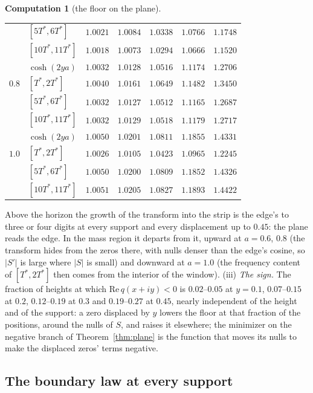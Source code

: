 \documentclass[11pt]{article}
\theoremstyle{definition}
\newtheorem{computation}[theorem]{Computation}
\theoremstyle{remark}
\newcommand{\Tst}{T^{*}}
\begin{document}
\begin{computation}[the floor on the plane]
\begin{center}
\begin{tabular}{@{}llccccc@{}}
 & $[5\Tst,6\Tst]$ & $1.0021$ & $1.0084$ & $1.0338$ & $1.0766$ & $1.1748$\\
 & $[10\Tst,11\Tst]$ & $1.0018$ & $1.0073$ & $1.0294$ & $1.0666$ & $1.1520$\\
\midrule
 & $\cosh(2ya)$ & $1.0032$ & $1.0128$ & $1.0516$ & $1.1174$ & $1.2706$\\
$0.8$ & $[\Tst,2\Tst]$ & $1.0040$ & $1.0161$ & $1.0649$ & $1.1482$ & $1.3450$\\
 & $[5\Tst,6\Tst]$ & $1.0032$ & $1.0127$ & $1.0512$ & $1.1165$ & $1.2687$\\
 & $[10\Tst,11\Tst]$ & $1.0032$ & $1.0129$ & $1.0518$ & $1.1179$ & $1.2717$\\
\midrule
 & $\cosh(2ya)$ & $1.0050$ & $1.0201$ & $1.0811$ & $1.1855$ & $1.4331$\\
$1.0$ & $[\Tst,2\Tst]$ & $1.0026$ & $1.0105$ & $1.0423$ & $1.0965$ & $1.2245$\\
 & $[5\Tst,6\Tst]$ & $1.0050$ & $1.0200$ & $1.0809$ & $1.1852$ & $1.4326$\\
 & $[10\Tst,11\Tst]$ & $1.0051$ & $1.0205$ & $1.0827$ & $1.1893$ & $1.4422$\\
\bottomrule
\end{tabular}
\end{center}
Above the horizon the growth of the transform into the strip is the edge's to three or four digits at every support and every displacement up to $0.45$: the plane reads the edge. In the mass region it departs from it, upward at $a=0.6$, $0.8$ (the transform hides from the zeros there, with nulls denser than the edge's cosine, so $|S'|$ is large where $|S|$ is small) and downward at $a=1.0$ (the frequency content of $[\Tst,2\Tst]$ then comes from the interior of the window). (iii) \emph{The sign.} The fraction of heights at which $\mathrm{Re}\,q(x+iy)<0$ is $0.02$--$0.05$ at $y=0.1$, $0.07$--$0.15$ at $0.2$, $0.12$--$0.19$ at $0.3$ and $0.19$--$0.27$ at $0.45$, nearly independent of the height and of the support: a zero displaced by $y$ lowers the floor at that fraction of the positions, around the nulls of $S$, and raises it elsewhere; the minimizer on the negative branch of Theorem~\ref{thm:plane} is the function that moves its nulls to make the displaced zeros' terms negative.
\end{computation}


\subsection{The boundary law at every support}\label{sec:everysupport}
\end{document}

